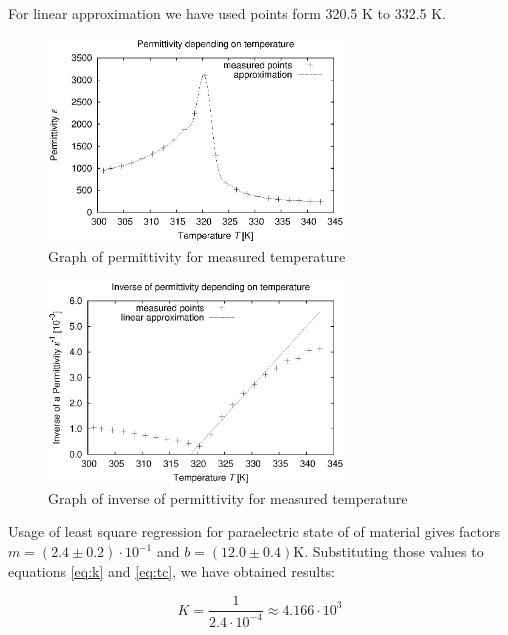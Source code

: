 \documentclass[a4paper,12pt]{article}
\begin{document}
    For linear approximation we have used points form 320.5 K to 332.5 K.

    \begin{figure}[H]
    \begin{center}
        \includegraphics[width=0.7\textwidth]{epsilon}
        \caption{Graph of permittivity for measured temperature}
        \label{fig:epsilon}
    \end{center}
    \end{figure}

    \begin{figure}[H]
    \begin{center}
        \includegraphics[width=0.7\textwidth]{epsilon-1}
        \caption{Graph of inverse of permittivity for measured temperature}
        \label{fig:epsilon-1}
    \end{center}
    \end{figure}

    Usage of least square regression for paraelectric state of of material gives
    factors $m = (2.4 \pm 0.2) \cdot 10^{-1}$ and $b = (12.0 \pm 0.4) \mathrm{K}$.
    Substituting those values to equations \ref{eq:k} and \ref{eq:tc}, we have
    obtained results:

    \begin{displaymath}
        K = \frac{1}{2.4 \cdot 10^{-4}} \approx 4.166 \cdot 10^3    
    \end{displaymath}
\end{document}
